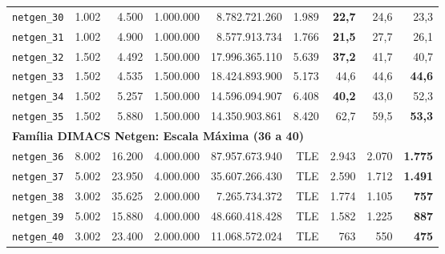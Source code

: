 \begin{longtable}{lrrrrrrrr}
\texttt{netgen\_30} & 1.002 & 4.500 & 1.000.000 & 8.782.721.260 & 1.989 & \textbf{22,7} & 24,6 & 23,3 \\
\texttt{netgen\_31} & 1.002 & 4.900 & 1.000.000 & 8.577.913.734 & 1.766 & \textbf{21,5} & 27,7 & 26,1 \\
\texttt{netgen\_32} & 1.502 & 4.492 & 1.500.000 & 17.996.365.110 & 5.639 & \textbf{37,2} & 41,7 & 40,7 \\
\texttt{netgen\_33} & 1.502 & 4.535 & 1.500.000 & 18.424.893.900 & 5.173 & 44,6 & 44,6 & \textbf{44,6} \\
\texttt{netgen\_34} & 1.502 & 5.257 & 1.500.000 & 14.596.094.907 & 6.408 & \textbf{40,2} & 43,0 & 52,3 \\
\texttt{netgen\_35} & 1.502 & 5.880 & 1.500.000 & 14.350.903.861 & 8.420 & 62,7 & 59,5 & \textbf{53,3} \\
\midrule
\multicolumn{9}{l}{\textbf{Família DIMACS Netgen: Escala Máxima (36 a 40)}} \\
\midrule
\texttt{netgen\_36} & 8.002 & 16.200 & 4.000.000 & 87.957.673.940 & TLE & 2.943 & 2.070 & \textbf{1.775} \\
\texttt{netgen\_37} & 5.002 & 23.950 & 4.000.000 & 35.607.266.430 & TLE & 2.590 & 1.712 & \textbf{1.491} \\
\texttt{netgen\_38} & 3.002 & 35.625 & 2.000.000 & 7.265.734.372 & TLE & 1.774 & 1.105 & \textbf{757} \\
\texttt{netgen\_39} & 5.002 & 15.880 & 4.000.000 & 48.660.418.428 & TLE & 1.582 & 1.225 & \textbf{887} \\
\texttt{netgen\_40} & 3.002 & 23.400 & 2.000.000 & 11.068.572.024 & TLE & 763 & 550 & \textbf{475} \\
\end{longtable}
\endgroup

